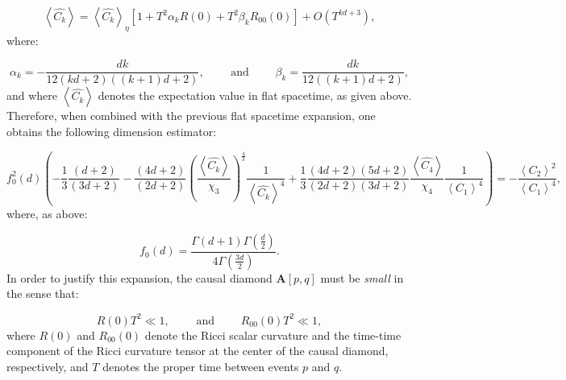 \documentclass{article}
\begin{document}
\begin{equation}
\left\langle \hat{C_k} \right\rangle = \left\langle \hat{C_k} \right\rangle_{\eta} \left[ 1 + T^2 \alpha_k R \left( 0 \right) + T^2 \beta_k R_{0 0} \left( 0 \right) \right] + O \left( T^{k d + 3} \right),
\end{equation}
where:

\begin{equation}
\alpha_k = - \frac{d k}{12 \left( k d + 2 \right) \left( \left( k + 1 \right) d + 2 \right)}, \qquad \text{ and } \qquad \beta_k = \frac{d k}{12 \left( \left( k + 1 \right) d + 2 \right)},
\end{equation}
and where ${\left\langle \hat{C_k} \right\rangle}$ denotes the expectation value in flat spacetime, as given above. Therefore, when combined with the previous flat spacetime expansion, one obtains the following dimension estimator:

\begin{equation}
f_{0}^{2} \left( d \right) \left( - \frac{1}{3} \frac{\left( d + 2 \right)}{\left( 3d + 2 \right)} - \frac{\left( 4d + 2 \right)}{\left( 2d + 2 \right)} \left( \frac{\left\langle \hat{C_k} \right\rangle}{\chi_3} \right)^{\frac{4}{3}} \frac{1}{\left\langle \hat{C_k} \right\rangle^4} + \frac{1}{3} \frac{\left( 4d + 2 \right) \left( 5d + 2 \right)}{\left( 2d + 2 \right) \left( 3d + 2 \right)} \frac{\left\langle \hat{C_4} \right\rangle}{\chi_4} \frac{1}{\left\langle C_1 \right\rangle^4} \right) = - \frac{\left\langle C_2 \right\rangle^2}{\left\langle C_1 \right\rangle^4},
\end{equation}
where, as above:

\begin{equation}
f_0 \left( d \right) = \frac{\Gamma \left( d + 1 \right) \Gamma \left( \frac{d}{2} \right)}{4 \Gamma \left( \frac{3d}{2} \right)}.
\end{equation}
In order to justify this expansion, the causal diamond ${\mathbf{A} \left[ p, q \right]}$ must be \textit{small} in the sense that:

\begin{equation}
R \left( 0 \right) T^2 \ll 1, \qquad \text{ and } \qquad R_{0 0} \left( 0 \right) T^2 \ll 1,
\end{equation}
where ${R \left( 0 \right)}$ and ${R_{0 0} \left( 0 \right)}$ denote the Ricci scalar curvature and the time-time component of the Ricci curvature tensor at the center of the causal diamond, respectively, and $T$ denotes the proper time between events $p$ and $q$.
\end{document}
